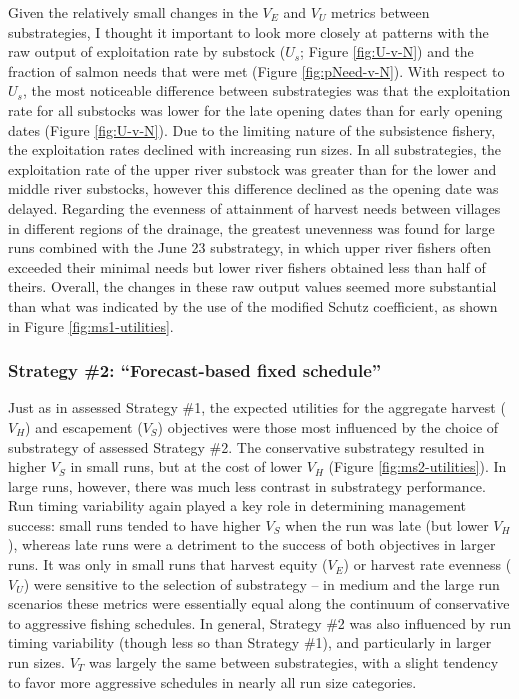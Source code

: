 \documentclass[12pt,]{book}
\theoremstyle{definition}
\theoremstyle{definition}
\theoremstyle{definition}
\theoremstyle{remark}
\begin{document}
Given the relatively small changes in the \(V_E\) and \(V_U\) metrics
between substrategies, I thought it important to look more closely at
patterns with the raw output of exploitation rate by substock (\(U_s\);
Figure \ref{fig:U-v-N}) and the fraction of salmon needs that were met
(Figure \ref{fig:pNeed-v-N}). With respect to \(U_s\), the most
noticeable difference between substrategies was that the exploitation
rate for all substocks was lower for the late opening dates than for
early opening dates (Figure \ref{fig:U-v-N}). Due to the limiting nature
of the subsistence fishery, the exploitation rates declined with
increasing run sizes. In all substrategies, the exploitation rate of the
upper river substock was greater than for the lower and middle river
substocks, however this difference declined as the opening date was
delayed. Regarding the evenness of attainment of harvest needs between
villages in different regions of the drainage, the greatest unevenness
was found for large runs combined with the June 23 substrategy, in which
upper river fishers often exceeded their minimal needs but lower river
fishers obtained less than half of theirs. Overall, the changes in these
raw output values seemed more substantial than what was indicated by the
use of the modified Schutz coefficient, as shown in Figure
\ref{fig:ms1-utilities}.

\subsubsection{\texorpdfstring{Strategy \#2: ``Forecast-based fixed
schedule''}{Strategy \#2: Forecast-based fixed schedule}}\label{strategy-2-forecast-based-fixed-schedule-1}

\noindent
Just as in assessed Strategy \#1, the expected utilities for the
aggregate harvest (\(V_H\)) and escapement (\(V_S\)) objectives were
those most influenced by the choice of substrategy of assessed Strategy
\#2. The conservative substrategy resulted in higher \(V_S\) in small
runs, but at the cost of lower \(V_H\) (Figure \ref{fig:ms2-utilities}).
In large runs, however, there was much less contrast in substrategy
performance. Run timing variability again played a key role in
determining management success: small runs tended to have higher \(V_S\)
when the run was late (but lower \(V_H\)), whereas late runs were a
detriment to the success of both objectives in larger runs. It was only
in small runs that harvest equity (\(V_E\)) or harvest rate evenness
(\(V_U\)) were sensitive to the selection of substrategy -- in medium
and the large run scenarios these metrics were essentially equal along
the continuum of conservative to aggressive fishing schedules. In
general, Strategy \#2 was also influenced by run timing variability
(though less so than Strategy \#1), and particularly in larger run
sizes. \(V_T\) was largely the same between substrategies, with a slight
tendency to favor more aggressive schedules in nearly all run size
categories.
\end{document}
